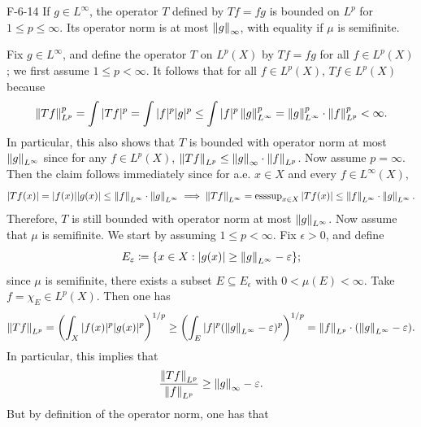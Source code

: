 \documentclass{article}
\begin{document}
	\begin{prb}{F-6-14}
		If $g \in L^{\infty}$, the operator $T$ defined by $Tf = fg$ is bounded on $L^{p}$ for $1 \leq p \leq \infty$. Its operator norm is at most $\left\Vert g \right\Vert_{\infty}$, with equality if $\mu$ is semifinite. 
	\end{prb}
	Fix $g \in L^{\infty}$, and define the operator $T$ on $L^{p}(X)$ by $Tf = fg$ for all $f \in L^{p}(X)$; we first assume $1 \leq p < \infty$. It follows that for all $f \in L^{p}(X)$, $Tf \in L^{p}(X)$ because 
	\begin{equation*}
		\left\Vert Tf \right\Vert_{L^{p}}^{p} = \int |Tf|^{p} = \int |f|^{p}|g|^{p}\leq \int |f|^{p}\left\Vert g \right\Vert_{L^{\infty}}^{p} = \left\Vert g \right\Vert_{L^{\infty}}^{p} \cdot \left\Vert f \right\Vert_{L^{p}}^{p} < \infty. 
	\end{equation*}
	In particular, this also shows that $T$ is bounded with operator norm at most $\left\Vert g \right\Vert_{L^{\infty}}$ since for any $f \in L^{p}(X)$, $\left\Vert Tf \right\Vert_{L^{p}} \leq \left\Vert g \right\Vert_{\infty} \cdot \left\Vert f \right\Vert_{L^{p}}$. Now assume $p = \infty$. Then the claim follows immediately since for a.e. $x \in X$ and every $f \in L^{\infty}(X)$, 
	\begin{equation*}
		|Tf(x)| = |f(x)||g(x)| \leq \left\Vert f \right\Vert_{L^{\infty}} \cdot \left\Vert g \right\Vert_{L^{\infty}} \implies \left\Vert Tf \right\Vert_{L^{\infty}} =\operatorname{ess sup}_{x \in X}|Tf(x)| \leq \left\Vert f \right\Vert_{L^{\infty}} \cdot \left\Vert g \right\Vert_{L^{\infty}}. 
	\end{equation*}
	Therefore, $T$ is still bounded with operator norm at most $\left\Vert g \right\Vert_{L^{\infty}}$. Now assume that $\mu$ is semifinite. We start by assuming $1 \leq p < \infty$. Fix $\epsilon > 0$, and define 
	\begin{equation*}
		E_{\varepsilon} \coloneqq \{x \in X: |g(x)| \geq \left\Vert g \right\Vert_{L^{\infty}} - \varepsilon\}; 
	\end{equation*}
	since $\mu$ is semifinite, there exists a subset $E \subseteq E_{\epsilon}$ with $0 < \mu(E) < \infty$. Take $f = \chi_{E} \in L^{p}(X)$. Then one has 
	\begin{equation*}
		\left\Vert Tf \right\Vert_{L^{p}} = \left(\int_{X}|f(x)|^{p}|g(x)|^{p}\right)^{1/p} \geq \left(\int_{E}|f|^{p}(\left\Vert g \right\Vert_{L^{\infty}} - \varepsilon)^{p}\right)^{1/p} = \left\Vert f \right\Vert_{L^{p}} \cdot (\left\Vert g \right\Vert_{L^{\infty}} - \varepsilon). 
	\end{equation*}
	In particular, this implies that 
	\begin{equation*}
		\frac{\left\Vert Tf \right\Vert_{L^{p}}}{\left\Vert f \right\Vert_{L^{p}}} \geq \left\Vert g \right\Vert_{\infty} - \varepsilon. 
	\end{equation*}
	But by definition of the operator norm, one has that 
\end{document}
